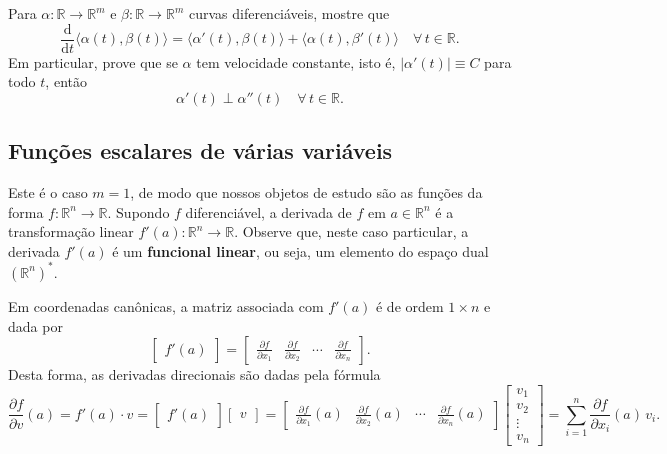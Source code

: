 \begin{exer}\label{exc:prodint}
	Para $\alpha: \mathbb{R} \to \mathbb{R}^m$ e $\beta: \mathbb{R} \to \mathbb{R}^m$ curvas diferenciáveis, mostre que
	\[
	\frac{\mathrm{d} }{\mathrm{d}  t} \big\langle \alpha (t), \beta (t) \big\rangle = \big\langle \alpha' (t), \beta (t) \big\rangle + \big\langle \alpha (t), \beta' (t) \big\rangle \quad \forall \, t \in \mathbb{R}.
	\] Em particular, prove que se $\alpha$ tem velocidade constante, isto é, $|\alpha'(t)| \equiv C$ para todo $t$, então
	\[
	\alpha'(t) \perp \alpha''(t) \quad \forall \, t \in \mathbb{R}.
	\]
\end{exer}




\subsection{Funções escalares de várias variáveis}

Este é o caso $m=1$, de modo que nossos objetos de estudo são as funções da forma $f: \mathbb{R}^n \to \mathbb{R}$. Supondo $f$ diferenciável, a derivada de $f$ em $a \in \mathbb{R}^n$ é a transformação linear $f'(a):\mathbb{R}^n \to \mathbb{R}$. Observe que, neste caso particular, a derivada $f'(a)$ é um \textbf{funcional linear}, ou seja, um elemento do espaço dual $(\mathbb{R}^n)^*$.

Em coordenadas canônicas, a matriz associada com $f'(a)$ é de ordem $1 \times n$ e dada por
\[
\begin{bmatrix}
f'(a)
\end{bmatrix} = \begin{bmatrix}
\frac{\partial f}{\partial x_1} & \frac{\partial f}{\partial x_2} & \cdots & \frac{\partial f}{\partial x_n}
\end{bmatrix}.
\] Desta forma, as derivadas direcionais são dadas pela fórmula
\begin{equation}\label{eqn:diferencial}
\frac{\partial f}{\partial v}(a) = f'(a) \cdot v = 
\begin{bmatrix}
f'(a)
\end{bmatrix} \begin{bmatrix}
v
\end{bmatrix} = \begin{bmatrix}
\frac{\partial f}{\partial x_1}(a) & \frac{\partial f}{\partial x_2}(a) & \cdots & \frac{\partial f}{\partial x_n}(a)
\end{bmatrix} 
\begin{bmatrix}
v_1 \\ v_2 \\ \vdots \\ v_n
\end{bmatrix} = \sum_{i=1}^{n} \frac{\partial f}{\partial x_i}(a) \, v_i.
\end{equation}

